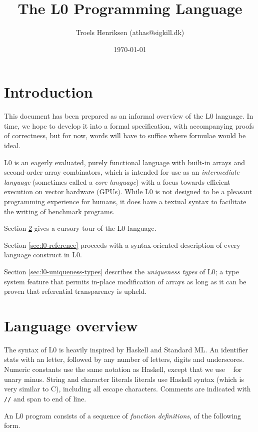 \documentclass[oneside]{memoir}
\title{The L0 Programming Language}
\date{\today}
\author{Troels Henriksen (athas@sigkill.dk)}
\begin{document}
\maketitle

\section{Introduction}

This document has been prepared as an informal overview of the L0
language.  In time, we hope to develop it into a formal specification,
with accompanying proofs of correctness, but for now, words will have
to suffice where formulae would be ideal.

L0 is an eagerly evaluated, purely functional language with built-in
arrays and second-order array combinators, which is intended for use
as an \emph{intermediate language} (sometimes called a \emph{core
  language}) with a focus towards efficient execution on vector
hardware (GPUs).  While L0 is not designed to be a pleasant
programming experience for humans, it does have a textual syntax to
facilitate the writing of benchmark programs.

Section \ref{sec:l0-overview} gives a cursory tour of the L0 language.

Section \ref{sec:l0-reference} proceeds with a syntax-oriented
description of every language construct in L0.

Section \ref{sec:l0-uniqueness-types} describes the \emph{uniqueness
  types} of L0; a type system feature that permits in-place
modification of arrays as long as it can be proven that referential
transparency is upheld.

\section{Language overview}
\label{sec:l0-overview}

The syntax of L0 is heavily inspired by Haskell and Standard ML.  An
identifier stats with an letter, followed by any number of letters,
digits and underscores.  Numeric constants use the same notation as
Haskell, except that we use \texttt{~} for unary minus.  String and
character literals literals use Haskell syntax (which is very similar
to C), including all escape characters.  Comments are indicated with
\texttt{//} and span to end of line.

An L0 program consists of a sequence of \emph{function definitions},
of the following form.
\end{document}
